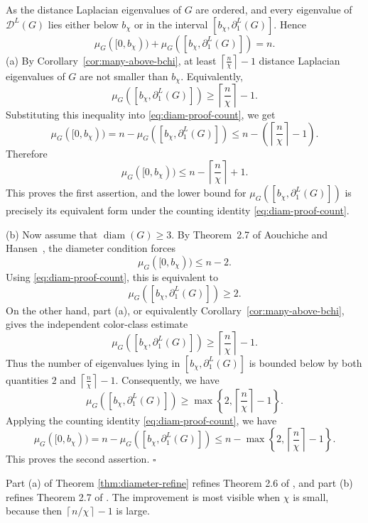 \documentclass[12pt]{article}
\newcommand{\DL}{\mathcal{D}^{L}}
\newcommand{\ceil}[1]{\left\lceil #1 \right\rceil}
\newcommand{\diam}{\operatorname{diam}}
\theoremstyle{plain}
\theoremstyle{definition}
\renewenvironment{proof}{{\noindent\bfseries Proof. }}{\hfill$\square$\par}
\begin{document}
\begin{proof}
	As the distance Laplacian eigenvalues of $G$ are ordered, and every eigenvalue of $\DL(G)$ lies either below $b_\chi$ or in the interval $[b_\chi,\partial_1^L(G)]$. Hence
	\begin{equation}\label{eq:diam-proof-count}
		\mu_G([0,b_\chi))+
		\mu_G([b_\chi,\partial_1^L(G)])=n.
	\end{equation}
	\noindent\textup{(a)}
	By Corollary~\ref{cor:many-above-bchi}, at least $\ceil{\frac{n}{\chi}}-1$ distance Laplacian eigenvalues of $G$ are not smaller than $b_\chi$. Equivalently,
	\[
	\mu_G([b_\chi,\partial_1^L(G)])
	\ge
	\ceil{\frac{n}{\chi}}-1.
	\]
	Substituting this inequality into \eqref{eq:diam-proof-count}, we get
	\[
	\mu_G([0,b_\chi))
	=
	n-\mu_G([b_\chi,\partial_1^L(G)])
	\le
	n-\left(\ceil{\frac{n}{\chi}}-1\right).
	\]
	Therefore
	\[
	\mu_G([0,b_\chi))
	\le
	n-\ceil{\frac{n}{\chi}}+1.
	\]
	This proves the first assertion, and the lower bound for
	$\mu_G([b_\chi,\partial_1^L(G)])$ is precisely its equivalent form under the counting identity
	\eqref{eq:diam-proof-count}.
	
	\noindent \textup{(b)}
	Now assume that $\diam(G)\ge3.$ By Theorem~2.7 of Aouchiche and Hansen~\cite{AouchicheHansen2017}, the diameter condition forces
	\[
	\mu_G([0,b_\chi))\le n-2.
	\]
	Using \eqref{eq:diam-proof-count}, this is equivalent to
	\[
	\mu_G([b_\chi,\partial_1^L(G)])\ge2.
	\]
	On the other hand, part \textup{(a)}, or equivalently Corollary~\ref{cor:many-above-bchi}, gives the independent color-class estimate
	\[
	\mu_G([b_\chi,\partial_1^L(G)])
	\ge
	\ceil{\frac{n}{\chi}}-1.
	\]
	Thus the number of eigenvalues lying in
	$[b_\chi,\partial_1^L(G)]$ is bounded below by both quantities
	 $2$ and $\ceil{\tfrac{n}{\chi}}-1.$ 
	Consequently, we have
	\[
	\mu_G([b_\chi,\partial_1^L(G)])
	\ge
	\max\left\{2,\ceil{\frac{n}{\chi}}-1\right\}.
	\]
	Applying the counting identity \eqref{eq:diam-proof-count}, we have
	\[
	\mu_G([0,b_\chi))
	=
	n-\mu_G([b_\chi,\partial_1^L(G)])
	\le
	n-\max\left\{2,\ceil{\frac{n}{\chi}}-1\right\}.
	\]
	This proves the second assertion.
\end{proof}

\medskip
\noindent  Part (a) of Theorem \ref{thm:diameter-refine} refines Theorem 2.6 of \cite{AouchicheHansen2017}, and part (b) refines Theorem
2.7 of \cite{AouchicheHansen2017}. The improvement is most visible when $\chi$ is small, because then
$\ceil{n/\chi}-1$ is large.

\medskip
\end{document}
